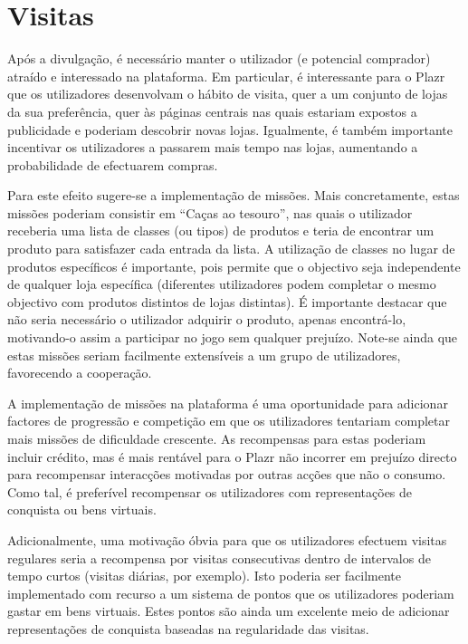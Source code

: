\section{Visitas}

Após a divulgação, é necessário manter o utilizador (e potencial comprador) atraído e interessado na plataforma. Em particular, é interessante para o Plazr que os utilizadores desenvolvam o hábito de visita, quer a um conjunto de lojas da sua preferência, quer às páginas centrais nas quais estariam expostos a publicidade e poderiam descobrir novas lojas.
Igualmente, é também importante incentivar os utilizadores a passarem mais tempo nas lojas, aumentando a probabilidade de efectuarem compras.

Para este efeito sugere-se a implementação de missões. Mais concretamente, estas missões poderiam consistir em ``Caças ao tesouro'', nas quais o utilizador receberia uma lista de classes (ou tipos) de produtos e teria de encontrar um produto para satisfazer cada entrada da lista. A utilização de classes no lugar de produtos específicos é importante, pois permite que o objectivo seja independente de qualquer loja específica (diferentes utilizadores podem completar o mesmo objectivo com produtos distintos de lojas distintas).
É importante destacar que não seria necessário o utilizador adquirir o produto, apenas encontrá-lo, motivando-o assim a participar no jogo sem qualquer prejuízo. Note-se ainda que estas missões seriam facilmente extensíveis a um grupo de utilizadores, favorecendo a cooperação.

A implementação de missões na plataforma é uma oportunidade para adicionar factores de progressão e competição em que os utilizadores tentariam completar mais missões de dificuldade crescente. As recompensas para estas poderiam incluir crédito, mas é mais rentável para o Plazr não incorrer em prejuízo directo para recompensar interacções motivadas por outras acções que não o consumo. Como tal, é preferível recompensar os utilizadores com representações de conquista ou bens virtuais.

Adicionalmente, uma motivação óbvia para que os utilizadores efectuem visitas regulares seria a recompensa por visitas consecutivas dentro de intervalos de tempo curtos (visitas diárias, por exemplo). Isto poderia ser facilmente implementado com recurso a um sistema de pontos que os utilizadores poderiam gastar em bens virtuais. Estes pontos são ainda um excelente meio de adicionar representações de conquista baseadas na regularidade das visitas.